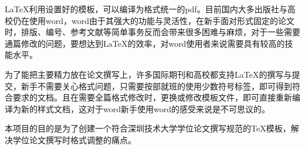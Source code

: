 
{}

\begin{abstractcn}
LaTeX利用设置好的模板，可以编译为格式统一的pdf。目前国内大多出版社与高校仍在使用word，word由于其强大的功能与灵活性，在新手面对形式固定的论文时，排版、编号、参考文献等简单事务反而会带来很多困难与麻烦，对于一些需要通篇修改的问题，要想达到LaTeX的效率，对word使用者来说需要具有较高的技能水平。

为了能把主要精力放在论文撰写上，许多国际期刊和高校都支持LaTeX的撰写与提交，新手不需要关心格式问题，只需要按部就班的使用少数符号标签，即可得到符合要求的文档。且在需要全篇格式修改时，更换或修改模板文件，即可直接重新编译为新的样式文档，这对于word新手使用word的感受来说是不可思议的。

本项目的目的是为了创建一个符合深圳技术大学学位论文撰写规范的TeX模板，解决学位论文撰写时格式调整的痛点。


\end{abstractcn}